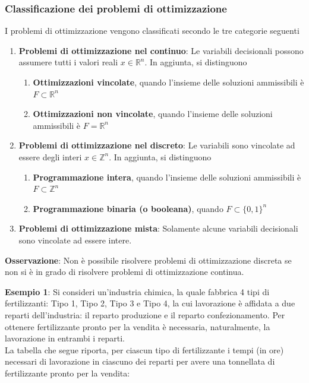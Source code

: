 \documentclass[a4paper]{extarticle}
\begin{document}
\subsubsection{Classificazione dei problemi di ottimizzazione}
I problemi di ottimizzazione vengono classificati secondo le tre categorie seguenti
\begin{enumerate}
    \item \textbf{Problemi di ottimizzazione nel continuo}: Le variabili decisionali possono assumere tutti i valori reali $x \in \mathbb{R}^n$. In aggiunta, si distinguono
    \begin{enumerate}
        \item \textbf{Ottimizzazioni vincolate}, quando l'insieme delle soluzioni ammissibili è $F \subset \mathbb{R}^n$
        \item \textbf{Ottimizzazioni non vincolate}, quando l'insieme delle soluzioni ammissibili è $F = \mathbb{R}^n$
    \end{enumerate}
    \item \textbf{Problemi di ottimizzazione nel discreto}: Le variabili sono vincolate ad essere degli interi $x \in \mathbb{Z}^n$. In aggiunta, si distinguono
    \begin{enumerate}
        \item \textbf{Programmazione intera}, quando l'insieme delle soluzioni ammissibili è $F \subset \mathbb{Z}^n$
        \item \textbf{Programmazione binaria (o booleana)}, quando $F \subset \{0,1\}^n$
    \end{enumerate}
    \item \textbf{Problemi di ottimizzazione mista}: Solamente alcune variabili decisionali sono vincolate ad essere intere.
\end{enumerate}

\vspace{1em}
\noindent
\textbf{Osservazione}: Non è possibile risolvere problemi di ottimizzazione discreta se non si è in grado di risolvere problemi di ottimizzazione continua.

\vspace{1em}
\noindent
\textbf{Esempio 1}: Si consideri un'industria chimica, la quale fabbrica 4 tipi di fertilizzanti: Tipo  1,  Tipo  2,  Tipo  3 e Tipo  4,  la cui  lavorazione  è affidata a due reparti dell'industria: il reparto produzione e il reparto confezionamento. Per ottenere fertilizzante pronto per la vendita è necessaria, naturalmente, la lavorazione in entrambi i reparti.\\
La tabella che segue riporta, per  ciascun  tipo  di  fertilizzante  i  tempi  (in ore)  necessari  di  lavorazione  in  ciascuno  dei  reparti  per  avere  una tonnellata di fertilizzante pronto per la vendita: 
\end{document}
